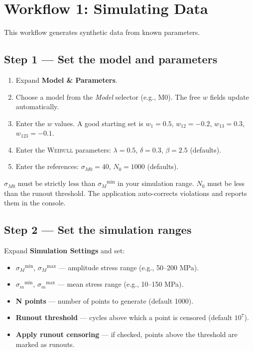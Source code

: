 \documentclass[11pt,a4paper]{article}
\newcommand{\sm}{\ensuremath{\sigma_m}}
\newcommand{\sM}{\ensuremath{\sigma_M}}
\newcommand{\sMzero}{\ensuremath{\sigma_{M0}}}
\newcommand{\Nzero}{\ensuremath{N_0}}
\newcommand{\Weibull}{\textsc{Weibull}}
\begin{document}
\section{Workflow 1: Simulating Data}

This workflow generates synthetic data from known parameters.

\subsection{Step 1 --- Set the model and parameters}

\begin{enumerate}[leftmargin=1.4em]
  \item Expand \textbf{Model \& Parameters}.
  \item Choose a model from the \textit{Model} selector (e.g., M0). The free $w$ fields update automatically.
  \item Enter the $w$ values. A good starting set is $w_1=0.5$, $w_{12}=-0.2$, $w_{13}=0.3$, $w_{123}=-0.1$.
  \item Enter the \Weibull{} parameters: $\lambda=0.5$, $\delta=0.3$, $\beta=2.5$ (defaults).
  \item Enter the references: $\sMzero=40$, $\Nzero=1000$ (defaults).
\end{enumerate}

\begin{warnbox}
$\sMzero$ must be strictly less than $\sM^{\min}$ in your simulation range. $\Nzero$ must be less than the runout threshold. The application auto-corrects violations and reports them in the console.
\end{warnbox}

\subsection{Step 2 --- Set the simulation ranges}

Expand \textbf{Simulation Settings} and set:
\begin{itemize}[leftmargin=1.4em]
  \item $\sM^{\min}$, $\sM^{\max}$ --- amplitude stress range (e.g., 50--200 MPa).
  \item $\sm^{\min}$, $\sm^{\max}$ --- mean stress range (e.g., 10--150 MPa).
  \item \textbf{N points} --- number of points to generate (default 1000).
  \item \textbf{Runout threshold} --- cycles above which a point is censored (default $10^7$).
  \item \textbf{Apply runout censoring} --- if checked, points above the threshold are marked as runouts.
\end{itemize}
\end{document}
